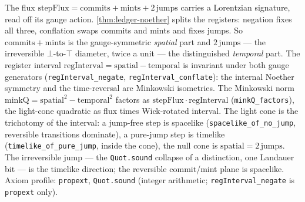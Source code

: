 \begin{theorem}\label{thm:ledger-minkowski-signature}\leanok{}
The flux \(\mathrm{stepFlux} = \mathrm{commits} + \mathrm{mints} +
2\,\mathrm{jumps}\) carries a Lorentzian signature, read off its gauge action.
\cref{thm:ledger-noether} splits the registers: negation fixes all three,
conflation swaps commits and mints and fixes jumps. So \(\mathrm{commits} +
\mathrm{mints}\) is the gauge-symmetric \emph{spatial} part and \(2\,\mathrm{jumps}\)
--- the irreversible \(\bot\)-to-\(\top\) diameter, twice a unit --- the
distinguished \emph{temporal} part. The register interval
\(\mathrm{regInterval} = \mathrm{spatial} - \mathrm{temporal}\) is invariant under
both gauge generators (\texttt{regInterval\_negate}, \texttt{regInterval\_conflate}):
the internal Noether symmetry and the time-reversal are Minkowski isometries. The
Minkowski norm \(\mathrm{minkQ} = \mathrm{spatial}^2 - \mathrm{temporal}^2\) factors
as \(\mathrm{stepFlux} \cdot \mathrm{regInterval}\) (\texttt{minkQ\_factors}), the
light-cone quadratic as flux times Wick-rotated interval. The light cone is the
trichotomy of the interval: a jump-free step is spacelike
(\texttt{spacelike\_of\_no\_jump}, reversible transitions dominate), a pure-jump
step is timelike (\texttt{timelike\_of\_pure\_jump}, inside the cone), the null cone
is \(\mathrm{spatial} = 2\,\mathrm{jumps}\). The irreversible jump --- the
\texttt{Quot.sound} collapse of a distinction, one Landauer bit --- is the timelike
direction; the reversible commit/mint plane is spacelike. Axiom profile:
\texttt{propext}, \texttt{Quot.sound} (integer arithmetic; \texttt{regInterval\_negate}
is \texttt{propext} only).
\end{theorem}

